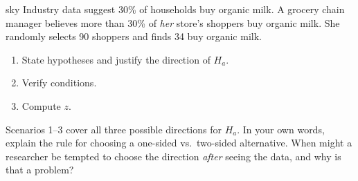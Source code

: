 \documentclass[10pt]{article}
\begin{document}
\begin{scenariobox}{sky}
Industry data suggest 30\% of households buy organic milk. A grocery chain manager believes
more than 30\% of \emph{her} store's shoppers buy organic milk. She randomly selects 90
shoppers and finds 34 buy organic milk.

\begin{enumerate}[label=\alph*.]
  \item State hypotheses and justify the direction of $H_a$.
  \item Verify conditions.
  \item Compute $z$.
\end{enumerate}
\end{scenariobox}

\begin{reflectionbox}
Scenarios 1--3 cover all three possible directions for $H_a$. In your own words, explain the
rule for choosing a one-sided vs.\ two-sided alternative. When might a researcher be tempted
to choose the direction \emph{after} seeing the data, and why is that a problem?
\end{reflectionbox}
\end{document}
